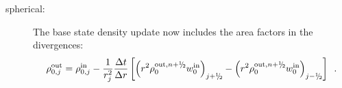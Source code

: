 \begin{enumerate}
\begin{description}
\item[spherical:] The base state density update now includes the area factors in the 
divergences:
\begin{equation}
\rho_{0,j}^{\outp} = \rho_{0,j}^{\inp}
 - \frac{1}{r_j^2} \frac{\dt}{\dr} 
 \left [ \left( r^2 \rho_0^{\outp,\nph} w_0^{\inp}\right)_{j+\myhalf} -  
          \left( r^2 \rho_0^{\outp,\nph} w_0^{\inp}\right)_{j-\myhalf} \right] \enskip. 
\end{equation}
\end{description}
%
%
%

\end{enumerate}
